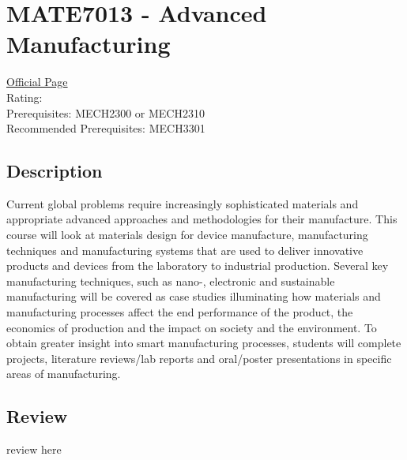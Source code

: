 \hypertarget{MATE7013}{\section{MATE7013 - Advanced Manufacturing}}

\large
\textcolor{turbo_purple}{\href{https://my.uq.edu.au/programs-courses/course.html?course_code=MATE7013}{Official Page}} \\
Rating: \cstar\cstar\cstar\cstar\ostar \\
Prerequisites: MECH2300 or MECH2310 \\
Recommended Prerequisites: MECH3301

\normalsize
\subsection*{Description}
Current global problems require increasingly sophisticated materials and appropriate advanced approaches and methodologies for their manufacture.
This course will look at materials design for device manufacture, manufacturing techniques and manufacturing systems that are used to deliver innovative products and devices from the laboratory to industrial production.
Several key manufacturing techniques, such as nano-, electronic and sustainable manufacturing will be covered as case studies illuminating how materials and manufacturing processes affect the end performance of the product, the economics of production and the impact on society and the environment.
To obtain greater insight into smart manufacturing processes, students will complete projects, literature reviews/lab reports and oral/poster presentations in specific areas of manufacturing.

\subsection*{Review}
review here
